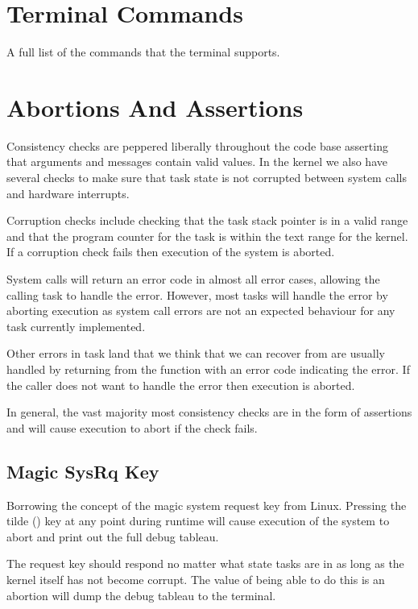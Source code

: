 \documentclass[pdftex,10pt,a4paper]{article}
\begin{document}
\section*{Terminal Commands}

A full list of the commands that the terminal supports.

\section*{Abortions And Assertions}

Consistency checks are peppered liberally throughout the code base
asserting that arguments and messages contain valid values. In the
kernel we also have several checks to make sure that task state is not
corrupted between system calls and hardware interrupts.

Corruption checks include checking that the task stack pointer is in a
valid range and that the program counter for the task is within the
text range for the kernel. If a corruption check fails then execution
of the system is aborted.

System calls will return an error code in almost all error cases,
allowing the calling task to handle the error. However, most tasks
will handle the error by aborting execution as system call errors are
not an expected behaviour for any task currently implemented.

Other errors in task land that we think that we can recover from are
usually handled by returning from the function with an error code
indicating the error. If the caller does not want to handle the error
then execution is aborted.

In general, the vast majority most consistency checks are in the form
of assertions and will cause execution to abort if the check fails.

\subsection*{Magic SysRq Key}

Borrowing the concept of the magic system request key from
Linux. Pressing the tilde () key at any point during runtime
will cause execution of the system to abort and print out the full
debug tableau.

The request key should respond no matter what state tasks are in as
long as the kernel itself has not become corrupt. The value of being
able to do this is an abortion will dump the debug tableau to the
terminal.
\end{document}
